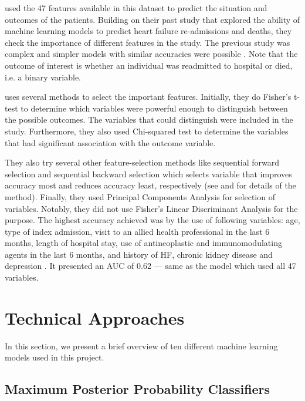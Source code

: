 \documentclass{article}
\begin{document}
\citet{awan2019feature} used the 47 features available in this dataset to predict the situation and outcomes of the patients. Building on their past study \citep{awan2019machine} that explored the ability of machine learning models to predict heart failure re-admissions and deaths, they check the importance of different features in the study. The previous study was complex and simpler models with similar accuracies were possible \citep{awan2019feature}. Note that the outcome of interest is whether an individual was readmitted to hospital or died, i.e. a binary variable. 

\citet{awan2019feature} uses several methods to select the important features. Initially, they do Fisher's t-test \citep{fisher1992statistical} to determine which variables were powerful enough to distinguish between the possible outcomes. The variables that could distinguish were included in the study. Furthermore, they also used Chi-squared test \citep{pearson1900x} to determine the variables that had significant association with the outcome variable.

They also try several other feature-selection methods like sequential forward selection and sequential backward selection which selects variable that improves accuracy most and reduces accuracy least, respectively (see \citet{marcano2010feature} and \citet{papatheocharous2012feature} for details of the method). Finally, they used Principal Components Analysis \citep{wold1987principal} for selection of variables. Notably, they did not use Fisher's Linear Discriminant Analysis \citep{cohen2014applied} for the purpose. The highest accuracy achieved was by the use of following variables: age, type of index admission, visit to an allied health professional in the last 6 months, length of hospital stay, use of antineoplastic and immunomodulating agents in the last 6 months, and history of HF, chronic kidney disease and depression \citep{awan2019feature}. It presented an AUC of 0.62 — same as the model which used all 47 variables.


\section{Technical Approaches}

In this section, we present a brief overview of ten different machine learning models used in this project.

\subsection{Maximum Posterior Probability Classifiers}
\end{document}
